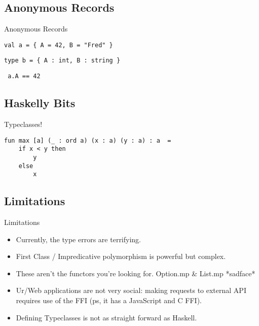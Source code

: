 \documentclass{beamer}
\begin{document}
\subsection{Anonymous Records}
\begin{frame}[fragile]{Anonymous Records}
\begin{verbatim}
val a = { A = 42, B = "Fred" }
\end{verbatim}
\begin{verbatim}
type b = { A : int, B : string }
\end{verbatim}
\begin{verbatim} a.A == 42 \end{verbatim}
\end{frame}

\subsection{Haskelly Bits}
\begin{frame}[fragile]{Typeclasses!}
\begin{verbatim}
fun max [a] (_ : ord a) (x : a) (y : a) : a  =
    if x < y then
        y
    else
        x
\end{verbatim}
\end{frame}

\subsection{Limitations}
\begin{frame}[fragile]{Limitations}
\begin{itemize}
\item Currently, the type errors are terrifying.
\item First Class / Impredicative polymorphism is powerful but complex.
\item These aren't the functors you're looking for. Option.mp \& List.mp *sadface*
\item Ur/Web applications are not very social: making requests to external API requires use of the FFI (ps, it has a JavaScript and C FFI).
\item Defining Typeclasses is not as straight forward as Haskell.
\end{itemize}
\end{frame}
\end{document}
